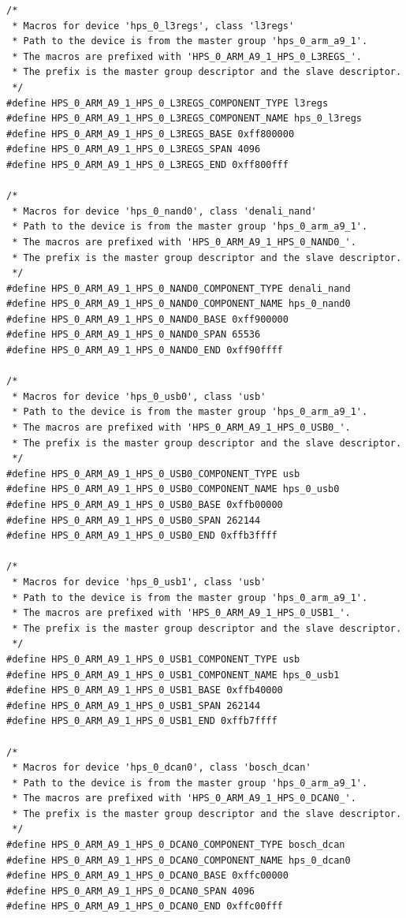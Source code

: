 \documentclass[conference]{IEEEtran}
\begin{document}
\begin{lstlisting}
/*
 * Macros for device 'hps_0_l3regs', class 'l3regs'
 * Path to the device is from the master group 'hps_0_arm_a9_1'.
 * The macros are prefixed with 'HPS_0_ARM_A9_1_HPS_0_L3REGS_'.
 * The prefix is the master group descriptor and the slave descriptor.
 */
#define HPS_0_ARM_A9_1_HPS_0_L3REGS_COMPONENT_TYPE l3regs
#define HPS_0_ARM_A9_1_HPS_0_L3REGS_COMPONENT_NAME hps_0_l3regs
#define HPS_0_ARM_A9_1_HPS_0_L3REGS_BASE 0xff800000
#define HPS_0_ARM_A9_1_HPS_0_L3REGS_SPAN 4096
#define HPS_0_ARM_A9_1_HPS_0_L3REGS_END 0xff800fff

/*
 * Macros for device 'hps_0_nand0', class 'denali_nand'
 * Path to the device is from the master group 'hps_0_arm_a9_1'.
 * The macros are prefixed with 'HPS_0_ARM_A9_1_HPS_0_NAND0_'.
 * The prefix is the master group descriptor and the slave descriptor.
 */
#define HPS_0_ARM_A9_1_HPS_0_NAND0_COMPONENT_TYPE denali_nand
#define HPS_0_ARM_A9_1_HPS_0_NAND0_COMPONENT_NAME hps_0_nand0
#define HPS_0_ARM_A9_1_HPS_0_NAND0_BASE 0xff900000
#define HPS_0_ARM_A9_1_HPS_0_NAND0_SPAN 65536
#define HPS_0_ARM_A9_1_HPS_0_NAND0_END 0xff90ffff

/*
 * Macros for device 'hps_0_usb0', class 'usb'
 * Path to the device is from the master group 'hps_0_arm_a9_1'.
 * The macros are prefixed with 'HPS_0_ARM_A9_1_HPS_0_USB0_'.
 * The prefix is the master group descriptor and the slave descriptor.
 */
#define HPS_0_ARM_A9_1_HPS_0_USB0_COMPONENT_TYPE usb
#define HPS_0_ARM_A9_1_HPS_0_USB0_COMPONENT_NAME hps_0_usb0
#define HPS_0_ARM_A9_1_HPS_0_USB0_BASE 0xffb00000
#define HPS_0_ARM_A9_1_HPS_0_USB0_SPAN 262144
#define HPS_0_ARM_A9_1_HPS_0_USB0_END 0xffb3ffff

/*
 * Macros for device 'hps_0_usb1', class 'usb'
 * Path to the device is from the master group 'hps_0_arm_a9_1'.
 * The macros are prefixed with 'HPS_0_ARM_A9_1_HPS_0_USB1_'.
 * The prefix is the master group descriptor and the slave descriptor.
 */
#define HPS_0_ARM_A9_1_HPS_0_USB1_COMPONENT_TYPE usb
#define HPS_0_ARM_A9_1_HPS_0_USB1_COMPONENT_NAME hps_0_usb1
#define HPS_0_ARM_A9_1_HPS_0_USB1_BASE 0xffb40000
#define HPS_0_ARM_A9_1_HPS_0_USB1_SPAN 262144
#define HPS_0_ARM_A9_1_HPS_0_USB1_END 0xffb7ffff

/*
 * Macros for device 'hps_0_dcan0', class 'bosch_dcan'
 * Path to the device is from the master group 'hps_0_arm_a9_1'.
 * The macros are prefixed with 'HPS_0_ARM_A9_1_HPS_0_DCAN0_'.
 * The prefix is the master group descriptor and the slave descriptor.
 */
#define HPS_0_ARM_A9_1_HPS_0_DCAN0_COMPONENT_TYPE bosch_dcan
#define HPS_0_ARM_A9_1_HPS_0_DCAN0_COMPONENT_NAME hps_0_dcan0
#define HPS_0_ARM_A9_1_HPS_0_DCAN0_BASE 0xffc00000
#define HPS_0_ARM_A9_1_HPS_0_DCAN0_SPAN 4096
#define HPS_0_ARM_A9_1_HPS_0_DCAN0_END 0xffc00fff


\end{lstlisting}
\end{document}
